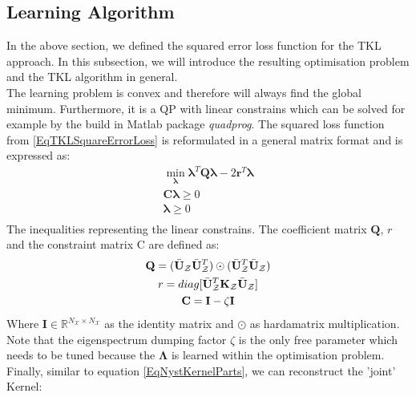 \subsection{Learning Algorithm}\label{InSubSecLearnAlgo}
In the above section, we defined the squared error loss function for the \acs{TKL} approach.
In this subsection, we will introduce the resulting optimisation problem and the \acs{TKL} algorithm in general.\\
The learning problem is convex and therefore will always find the global minimum.
Furthermore, it is a \ac{QP} with linear constrains which can be solved for example by the build in Matlab package \textit{quadprog}.
The squared loss function from \eqref{EqTKLSquareErrorLoss} is reformulated in a general matrix format and is expressed as:\cite{Long.}
\begin{equation}\label{EqTklQP}
	\begin{gathered}
		\min_{\boldsymbol{\lambda}} \boldsymbol{\lambda}^T \mathbf{Q} \boldsymbol{\lambda} - 2\mathbf{r}^T\boldsymbol{\lambda}\\
		\mathbf{C}\boldsymbol{\lambda} \ge 0 \\
		\boldsymbol{\lambda} \ge 0 \\
	\end{gathered}
\end{equation}
The inequalities representing the linear constrains.
The coefficient matrix $\mathbf{Q}$, $r$ and the constraint matrix C are defined as:
\begin{equation}\label{EqTklQPCons}
		\begin{gathered}
			\mathbf{Q} = (\bar{\mathbf{U}}_\mathcal{Z} \bar{\mathbf{U}}_\mathcal{Z}^T)\odot (\bar{\mathbf{U}}_\mathcal{Z}^T \bar{\mathbf{U}}_\mathcal{Z})\\
			r = diag[\bar{\mathbf{U}}_\mathcal{Z}^T \mathbf{K}_\mathcal{Z} \bar{\mathbf{U}}_\mathcal{Z}]\\
			\mathbf{C} = \mathbf{I} - \zeta \mathbf{I}
		\end{gathered}
\end{equation}
Where $\mathbf{I} \in \mathbb{R}^{N_\mathcal{X}\times N_\mathcal{X}}$ as the identity matrix and $\odot$ as hardamatrix multiplication.
Note that the eigenspectrum dumping factor $\zeta$ is the only free parameter which needs to be tuned because the $\boldsymbol{\Lambda}$ is learned within the optimisation problem.\\
Finally, similar to equation \ref{EqNystKernelParts}, we can reconstruct the 'joint' Kernel:\cite{Long.}

